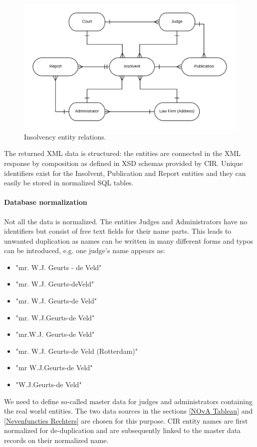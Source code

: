 \begin{figure}[h]
\includegraphics[width=1\linewidth]{cir_erd.png}
\caption{Insolvency entity relations.}
\end{figure}

The returned XML data is structured: the entities are connected in the XML response by composition as defined in XSD schemas provided by CIR. Unique identifiers exist for the Insolvent, Publication and Report entities and they can easily be stored in normalized SQL tables. 

\paragraph{Database normalization}
Not all the data is normalized. The entities Judges and Administrators have no identifiers but consist of free text fields for their name parts. This leads to unwanted duplication as names can be written in many different forms and typos can be introduced, e.g. one judge's name appears as:

\begin{itemize}
\item "mr. W.J. Geurts - de Veld"
\item "mr. W.J. Geurts-deVeld"
\item "mr. W.J. Geurts-de Veld"
\item "mr. W.J.Geurts-de Veld"
\item "mr.W.J. Geurts-de Veld"
\item "mr. W.J. Geurts-de Veld (Rotterdam)"
\item "mr W.J.Geurts-de Veld"
\item "W.J.Geurts-de Veld"
\end{itemize}

We need to define so-called master data for judges and administrators containing the real world entities. The two data sources in the sections \ref{NOvA Tableau} and \ref{Nevenfuncties Rechters} are chosen for this purpose. CIR entity names are first normalized for de-duplication and are subsequently linked to the master data records on their normalized name. 

